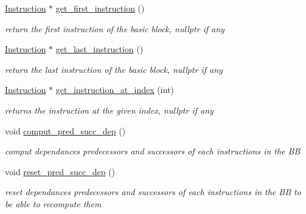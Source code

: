 \begin{DoxyCompactItemize}
\mbox{\label{class_basic__block_ae6bb481bd9c6352a9f3d7bc5bb2680ac}} 
\mbox{\hyperlink{class_instruction}{Instruction}} $\ast$ \mbox{\hyperlink{class_basic__block_ae6bb481bd9c6352a9f3d7bc5bb2680ac}{get\+\_\+first\+\_\+instruction}} ()
\begin{DoxyCompactList}\small\item\em return the first instruction of the basic block, nullptr if any \end{DoxyCompactList}\item 
\mbox{\label{class_basic__block_a7083c8485a2378cdfae477a8466eb348}} 
\mbox{\hyperlink{class_instruction}{Instruction}} $\ast$ \mbox{\hyperlink{class_basic__block_a7083c8485a2378cdfae477a8466eb348}{get\+\_\+last\+\_\+instruction}} ()
\begin{DoxyCompactList}\small\item\em return the last instruction of the basic block, nullptr if any \end{DoxyCompactList}\item 
\mbox{\label{class_basic__block_a84aa42e38e2494c2f8ab0a159dba3ca8}} 
\mbox{\hyperlink{class_instruction}{Instruction}} $\ast$ \mbox{\hyperlink{class_basic__block_a84aa42e38e2494c2f8ab0a159dba3ca8}{get\+\_\+instruction\+\_\+at\+\_\+index}} (int)
\begin{DoxyCompactList}\small\item\em returns the instruction at the given index, nullptr if any \end{DoxyCompactList}\item 
\mbox{\label{class_basic__block_a2f2cdedde41f78b7982e6d6d348524c2}} 
void \mbox{\hyperlink{class_basic__block_a2f2cdedde41f78b7982e6d6d348524c2}{comput\+\_\+pred\+\_\+succ\+\_\+dep}} ()
\begin{DoxyCompactList}\small\item\em comput dependances predecessors and successors of each instructions in the BB \end{DoxyCompactList}\item 
\mbox{\label{class_basic__block_a4ef46cdfb1fa30e3edfc0407b008fa08}} 
void \mbox{\hyperlink{class_basic__block_a4ef46cdfb1fa30e3edfc0407b008fa08}{reset\+\_\+pred\+\_\+succ\+\_\+dep}} ()
\begin{DoxyCompactList}\small\item\em reset dependances predecessors and successors of each instructions in the BB to be able to recompute them \end{DoxyCompactList}\item 

\end{DoxyCompactItemize}
